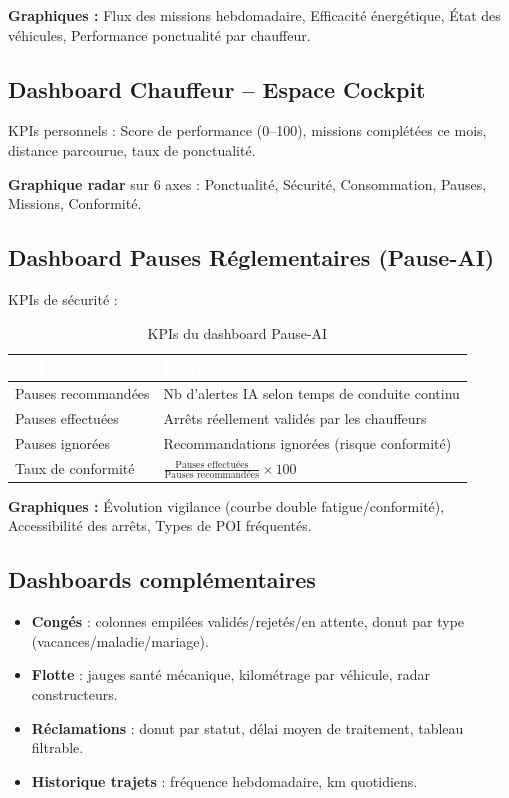 \documentclass[12pt,a4paper]{report}
\newcommand{\thead}[1]{\cellcolor{tablehead}\textcolor{white}{\textbf{#1}}}
\begin{document}
\textbf{Graphiques :} Flux des missions hebdomadaire, Efficacité énergétique,
État des véhicules, Performance ponctualité par chauffeur.

\subsection{Dashboard Chauffeur -- Espace Cockpit}

KPIs personnels : Score de performance (0--100), missions complétées
ce mois, distance parcourue, taux de ponctualité.

\textbf{Graphique radar} sur 6 axes : Ponctualité, Sécurité, Consommation,
Pauses, Missions, Conformité.

\subsection{Dashboard Pauses Réglementaires (Pause-AI)}

KPIs de sécurité :

\begin{table}[H]
  \centering
  \caption{KPIs du dashboard Pause-AI}
  \label{tab:kpi_pause}
  \begin{tabularx}{\textwidth}{|l|Y|}
    \hline
    \thead{KPI} & \thead{Description} \\
    \hline
    Pauses recommandées &
      Nb d'alertes IA selon temps de conduite continu \\
    Pauses effectuées &
      Arrêts réellement validés par les chauffeurs \\
    Pauses ignorées &
      Recommandations ignorées (risque conformité) \\
    Taux de conformité &
      $\frac{\text{Pauses effectuées}}{\text{Pauses recommandées}} \times 100$ \\
    \hline
  \end{tabularx}
\end{table}

\textbf{Graphiques :} Évolution vigilance (courbe double fatigue/conformité),
Accessibilité des arrêts, Types de POI fréquentés.

\subsection{Dashboards complémentaires}

\begin{itemize}
  \item \textbf{Congés} : colonnes empilées validés/rejetés/en attente,
        donut par type (vacances/maladie/mariage).
  \item \textbf{Flotte} : jauges santé mécanique, kilométrage par véhicule,
        radar constructeurs.
  \item \textbf{Réclamations} : donut par statut, délai moyen de traitement,
        tableau filtrable.
  \item \textbf{Historique trajets} : fréquence hebdomadaire, km quotidiens.
\end{itemize}
\end{document}
